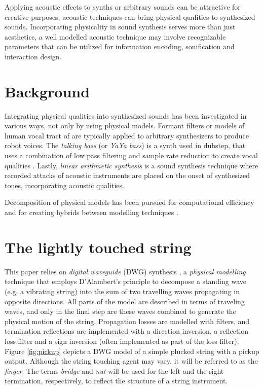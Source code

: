 \documentclass{sigchi}
\begin{document}
Applying acoustic effects to synths or arbitrary sounds can be attractive for creative purposes, acoustic techniques can bring physical qualities to synthesized sounds.
Incorporating physicality in sound synthesis serves more than just aesthetics, a well modelled acoustic technique may involve recognizable parameters that can be utilized for information encoding, sonification and interaction design.

\section{Background}
Integrating physical qualities into synthesized sounds has been investigated in various ways, not only by using physical models.
Formant filters or models of human vocal tract of are typically applied to arbitrary synthesizers to produce robot voices.
The \textit{talking bass} (or \textit{YaYa bass}) is a synth used in dubstep, that uses a combination of low pass filtering and sample rate reduction to create vocal qualities \cite{audio_digital_how_2014, dorincourt_reason_2010}.
Lastly, \textit{linear arithmetic synthesis} \cite{russ_l_1987} is a sound synthesis technique where recorded attacks of acoustic instruments are placed on the onset of synthesized tones, incorporating acoustic qualities.

Decomposition of physical models has been pursued for computational efficiency \cite{karjalainen_plucked-string_1998} and for creating hybrids between modelling techniques \cite{erkut_modular_2005}.


\section{The lightly touched string}

This paper relies on \textit{digital waveguide} (DWG) synthesis \cite{smith_physical_1992}, a \textit{physical modelling} technique that employs D'Alambert's principle to decompose a standing wave (e.g. a vibrating string) into the sum of two travelling waves propagating in opposite directions.
All parts of the model are described in terms of traveling waves, and only in the final step are these waves combined to generate the physical motion of the string.
Propagation losses are modelled with filters, and termination reflections are implemented with a direction inversion, a reflection loss filter and a sign inversion (often implemented as part of the loss filter).
Figure \ref{fig:pickup} depicts a DWG model of a simple plucked string with a pickup output.
Although the string touching agent may vary, it will be referred to as the \textit{finger}.
The terms \textit{bridge} and \textit{nut} will be used for the left and the right termination, respectively, to reflect the structure of a string instrument.
\end{document}
